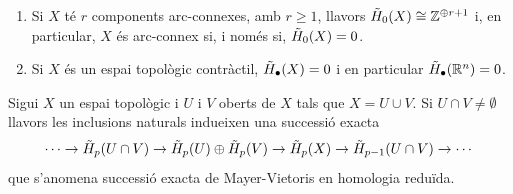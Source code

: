 \documentclass[../main.tex]{subfiles}
\begin{document}
\begin{ej}
\begin{enumerate}
    \item Si $X$ té $r$ components arc-connexes, amb $r\geq 1$, llavors $\Tilde{H}_0(X)\cong \mathbb{Z}^{\oplus r+1}$ i, en particular, $X$ és arc-connex si, i només si, $\Tilde{H}_0(X)=0$.
    \item Si $X$ és un espai topològic contràctil, $\Tilde{H}_\bullet(X)=0$ i en particular $\Tilde{H}_\bullet(\mathbb{R}^n)=0$.
\end{enumerate}
\end{ej}

\begin{prop}
Sigui $X$ un espai topològic i $U$ i $V$ oberts de $X$ tals que $X = U\cup V$. Si $U\cap V\not=\emptyset$ llavors les inclusions naturals indueixen una successió exacta
\begin{equation}
    \notag
    \cdots\rightarrow\Tilde{H}_p(U\cap V)\rightarrow \Tilde{H}_p(U)\oplus \Tilde{H}_p(V)\rightarrow \Tilde{H}_p(X)\rightarrow \Tilde{H}_{p-1}(U\cap V)\rightarrow\cdots
\end{equation}
que s'anomena successió exacta de Mayer-Vietoris en homologia reduïda.
\end{prop}
\end{document}
